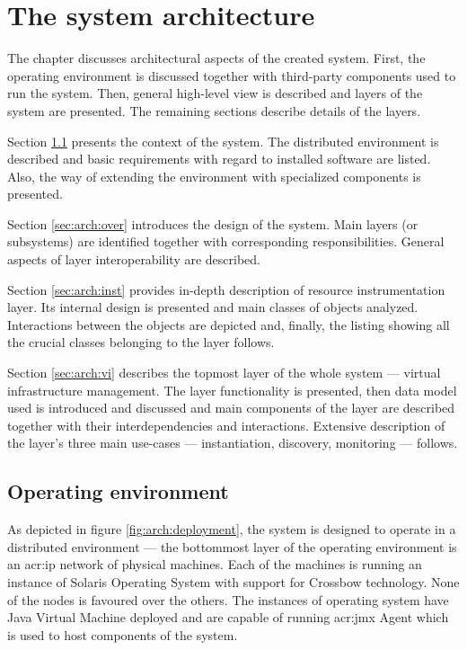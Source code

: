 \documentclass[11pt]{book}
\begin{document}
  \chapter{The system architecture}
  \label{chap:arch}

    The chapter discusses architectural aspects of the created system. First, the operating environment is discussed
    together with third-party components used to run the system. Then, general high-level view is described and
    layers of the system are presented. The remaining sections describe details of the layers.

    Section \ref{sec:arch:env} presents the context of the system. The distributed environment is described and
    basic requirements with regard to installed software are listed. Also, the way of extending the environment with
    specialized components is presented.

    Section \ref{sec:arch:over} introduces the design of the system. Main layers (or subsystems) are identified together
    with corresponding responsibilities. General aspects of layer interoperability are described.

    Section \ref{sec:arch:inst} provides in-depth description of resource instrumentation layer. Its internal design is
    presented and main classes of objects analyzed. Interactions between the objects are depicted and, finally, the
    listing showing all the crucial classes belonging to the layer follows.

    Section \ref{sec:arch:vi} describes the topmost layer of the whole system --- virtual infrastructure management. The
    layer functionality is presented, then data model used is introduced and discussed and main components of the layer
    are described together with their interdependencies and interactions. Extensive description of the layer's three
    main use-cases --- instantiation, discovery, monitoring --- follows.


    \section{Operating environment}
    \label{sec:arch:env}

      As depicted in figure \ref{fig:arch:deployment}, the system is designed to operate in a distributed environment
      --- the bottommost layer of the operating environment is an \gls{acr:ip} network of physical machines. Each of the machines
      is running an instance of Solaris Operating System with support for Crossbow technology. None of the nodes is
      favoured over the others. The instances of operating system have Java Virtual Machine deployed and are capable of
      running \gls{acr:jmx} Agent which is used to host components of the system.
\end{document}
